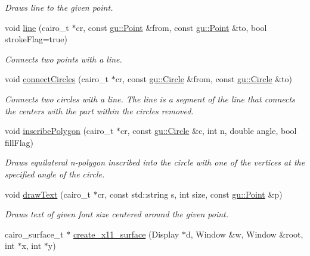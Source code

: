 \begin{DoxyCompactItemize}
\begin{DoxyCompactList}\small\item\em Draws line to the given point. \end{DoxyCompactList}\item 
void \hyperlink{namespaceslb_1_1core_1_1util_a05a341116f08209b05c9822725be127e}{line} (cairo\+\_\+t $\ast$cr, const \hyperlink{structslb_1_1core_1_1util_1_1gu_1_1Point}{gu\+::\+Point} \&from, const \hyperlink{structslb_1_1core_1_1util_1_1gu_1_1Point}{gu\+::\+Point} \&to, bool stroke\+Flag=true)
\begin{DoxyCompactList}\small\item\em Connects two points with a line. \end{DoxyCompactList}\item 
void \hyperlink{namespaceslb_1_1core_1_1util_ac07fdd8a1daaeee3d5c8b8445c5c9110}{connect\+Circles} (cairo\+\_\+t $\ast$cr, const \hyperlink{structslb_1_1core_1_1util_1_1gu_1_1Circle}{gu\+::\+Circle} \&from, const \hyperlink{structslb_1_1core_1_1util_1_1gu_1_1Circle}{gu\+::\+Circle} \&to)
\begin{DoxyCompactList}\small\item\em Connects two circles with a line. The line is a segment of the line that connects the centers with the part within the circles removed. \end{DoxyCompactList}\item 
void \hyperlink{namespaceslb_1_1core_1_1util_a265ab01b21987f23478c4a960a50820e}{inscribe\+Polygon} (cairo\+\_\+t $\ast$cr, const \hyperlink{structslb_1_1core_1_1util_1_1gu_1_1Circle}{gu\+::\+Circle} \&c, int n, double angle, bool fill\+Flag)
\begin{DoxyCompactList}\small\item\em Draws equilateral n-\/polygon inscribed into the circle with one of the vertices at the specified angle of the circle. \end{DoxyCompactList}\item 
void \hyperlink{namespaceslb_1_1core_1_1util_a95928fbd32acc4010efe2c6fc5d7191e}{draw\+Text} (cairo\+\_\+t $\ast$cr, const std\+::string s, int size, const \hyperlink{structslb_1_1core_1_1util_1_1gu_1_1Point}{gu\+::\+Point} \&p)
\begin{DoxyCompactList}\small\item\em Draws text of given font size centered around the given point. \end{DoxyCompactList}\item 
cairo\+\_\+surface\+\_\+t $\ast$ \hyperlink{namespaceslb_1_1core_1_1util_af57d4bad2c58dd80bdfb6e8fa9fca62c}{create\+\_\+x11\+\_\+surface} (Display $\ast$d, Window \&w, Window \&root, int $\ast$x, int $\ast$y)

\end{DoxyCompactItemize}
